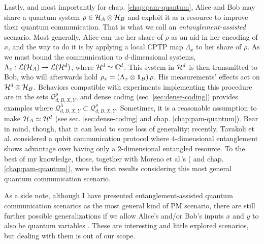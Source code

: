             Lastly, and most importantly for chap. \ref{chap:pam-quantum}, Alice and Bob may share a quantum system $\rho \in \mathcal{H}_A \otimes \mathcal{H}_B$ and exploit it as a resource to improve their quantum communication. That is what we call an \emph{entanglement-assisted} scenario. Most generally, Alice can use her share of $\rho$ as an aid in her encoding of $x$, and the way to do it is by applying a local CPTP map $\Lambda_x$ to her share of $\rho$. As we must bound the communication to $d$-dimensional systems, $\Lambda_x : \mathcal{L}(\mathcal{H}_A) \rightarrow \mathcal{L}(\mathcal{H}^{d})$, where $\mathcal{H}^{d} \simeq \mathbb{C}^d$. This system in $\mathcal{H}^{d}$ is then transmitted to Bob, who will afterwards hold $\rho_x = \left( \Lambda_x \otimes \mathbf{1}_B \right) \rho$. His measurements' effects act on $\mathcal{H}^{d} \otimes \mathcal{H}_B$. Behaviors compatible with experiments implementing this procedure are in the sets $\mathcal{Q}^\rho_{d,B,X,Y}$, and dense coding (sec. \ref{sec:dense-coding}) provides examples where $\mathcal{Q}^\lambda_{d,B,X,Y} \subset \mathcal{Q}^\rho_{d,B,X,Y}$. Sometimes, it is a reasonable assumption to make $\mathcal{H}_A \simeq \mathcal{H}^{d}$ (see sec. \ref{sec:dense-coding} and chap. \ref{chap:pam-quantum}). Bear in mind, though, that it can lead to some loss of generality: recently, Tavakoli et al. \cite{tavakoli_eapam_2021} considered a qubit communication protocol where $4$-dimensional entanglement shows advantage over having only a $2$-dimensional entangled resource. To the best of my knowledge, those, together with Moreno et al.'s (\cite{moreno_pamdense_2021} and chap. \ref{chap:pam-quantum}), were the first results considering this most general quantum communication scenario.
            
            As a side note, although I have presented entanglement-assisted quantum communication scenarios as the most general kind of PM scenario, there are still further possible generalizations if we allow Alice's and/or Bob's inputs $x$ and $y$ to also be quantum variables \cite{guerini_distributed_2019}. These are interesting and little explored scenarios, but dealing with them is out of our scope.
            
